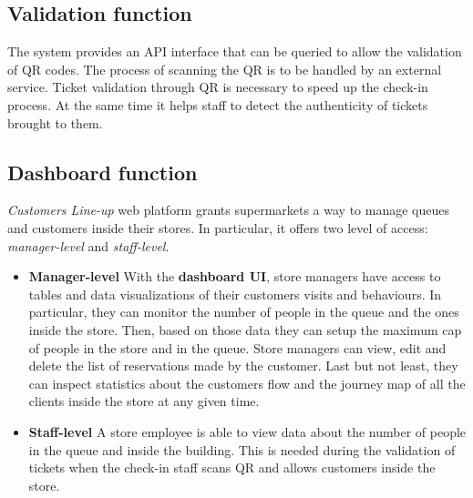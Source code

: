 \subsection{Validation function}
The system provides an API interface that can be queried to allow the validation of QR codes. The process of scanning the QR is to be handled by an external service.\newline
Ticket validation through QR is necessary to speed up the check-in process. At the same time it helps staff to detect the authenticity of tickets brought to them.

\subsection{Dashboard function}
\textit{Customers Line-up} web platform grants supermarkets a way to manage queues and customers inside their stores. In particular, it offers two level of access: \textit{manager-level} and \textit{staff-level}.

\begin{itemize}
	\item \textbf{Manager-level}\newline
	With the \textbf{dashboard UI}, store managers have access to tables and data visualizations of their customers visits and behaviours. In particular, they can monitor the number of people in the queue and the ones inside the store. Then, based on those data they can setup the maximum cap of people in the store and in the queue.\newline
	Store managers can view, edit and delete the list of reservations made by the customer.\newline
	Last but not least, they can inspect statistics about the customers flow and the journey map of all the clients inside the store at any given time.

	\item \textbf{Staff-level}\newline
	A store employee is able to view data about the number of people in the queue and inside the building. This is needed during the validation of tickets when the check-in staff scans QR and allows customers inside the store.
\end{itemize}

